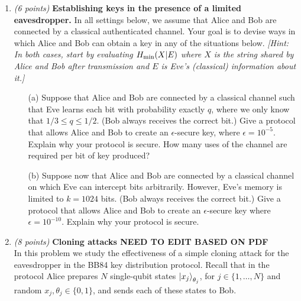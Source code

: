 \documentclass[12pt]{article}
\begin{document}
\begin{enumerate}
\item \emph{(6 points)} {\bf Establishing keys in the presence of a limited eavesdropper.}
In all settings below, we assume that Alice and Bob are connected by a classical authenticated channel. 
Your goal is to devise ways in which Alice and Bob can obtain a key in any of the situations below. \emph{[Hint: In both cases, start by evaluating $H_{\rm min}(X|E)$ where $X$ is the string shared by Alice and Bob after transmission and $E$ is Eve's (classical) information about it.]}
\begin{enumerate}
\item[(a)] Suppose that Alice and Bob are connected by a classical channel such that Eve learns each bit with probability exactly $q$, where we only know that
$1/3 \leq q \leq 1/2$. (Bob always receives the correct bit.)
Give a protocol that allows Alice and Bob to create an $\epsilon$-secure key, where $\epsilon = 10^{-5}$. Explain why your protocol is secure. How many uses of the channel are required per bit of key produced? 
\item[(b)] Suppose now that Alice and Bob are connected by a classical channel on which Eve can intercept bits arbitrarily. However, Eve's memory 
is limited to $k = 1024$ bits. (Bob always receives the correct bit.) Give a protocol that allows Alice and Bob to create an $\epsilon$-secure key where $\epsilon = 10^{-10}$. 
Explain why your protocol is secure.
\end{enumerate}


\item \emph{(8 points)} {\bf Cloning attacks NEED TO EDIT BASED ON PDF}\\ 
In this problem we study the effectiveness of a simple cloning attack for the eavesdropper in the BB84 key distribution protocol. Recall that in the protocol Alice prepares $N$ single-qubit states $\ket{x_j}_{\theta_j}$, for $j\in\{1,\ldots,N\}$ and random $x_j,\theta_j\in\{0,1\}$, and sends each of these states to Bob. 


\end{enumerate}
\end{document}
